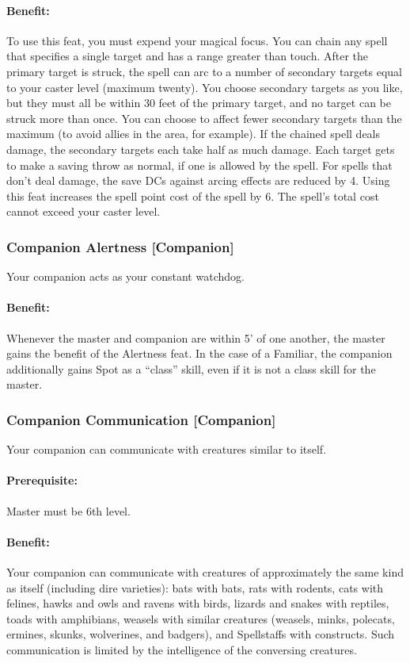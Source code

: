 \paragraph{Benefit:} To use this feat, you must expend your magical focus. 
You can chain any spell that specifies a single target and has a range greater than touch. 
After the primary target is struck, the spell can arc to a number of secondary targets equal to your caster level (maximum twenty).
You choose secondary targets as you like, but they must all be within 30 feet of the primary target, and no target can be struck more than once. 
You can choose to affect fewer secondary targets than the maximum (to avoid allies in the area, for example).
If the chained spell deals damage, the secondary targets each take half as much damage. 
Each target gets to make a saving throw as normal, if one is allowed by the spell. 
For spells that don't deal damage, the save DCs against arcing effects are reduced by 4.
Using this feat increases the spell point cost of the spell by 6. The spell's total cost cannot exceed your caster level.
\subsubsection[Companion Alertness]{Companion Alertness [Companion]}
\label{Feat:CompanionAlertness}
Your companion acts as your constant watchdog.

\paragraph{Benefit:} Whenever the master and companion are within 5' of one another, the master gains the benefit of the Alertness feat.
In the case of a Familiar, the companion additionally gains Spot as a ``class'' skill, even if it is not a class skill for the master.
\subsubsection[Companion Communication]{Companion Communication [Companion]}
\label{Feat:CompanionCommunication}
Your companion can communicate with creatures similar to itself.

\paragraph{Prerequisite:} Master must be 6th level.

\paragraph{Benefit:} Your companion can communicate with creatures of approximately the same kind as itself (including dire varieties): 
bats with bats, rats with rodents, cats with felines, hawks and owls and ravens with birds, 
lizards and snakes with reptiles, toads with amphibians, weasels with similar creatures (weasels, minks, polecats, ermines, skunks, wolverines, and badgers), and Spellstaffs with constructs. 
Such communication is limited by the intelligence of the conversing creatures. 


